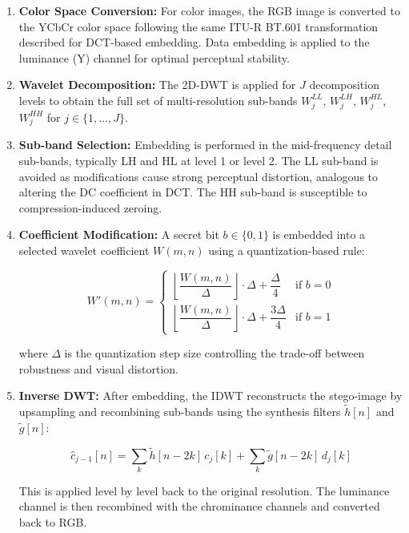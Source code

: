 \documentclass[12pt,a4paper,oneside]{report}
\begin{document}
	\begin{enumerate}
		\item \textbf{Color Space Conversion:}
		For color images, the RGB image is converted to the YCbCr color space following the same ITU-R BT.601 transformation described for DCT-based embedding. Data embedding is applied to the luminance (Y) channel for optimal perceptual stability.
		
		\item \textbf{Wavelet Decomposition:}
		The 2D-DWT is applied for $J$ decomposition levels to obtain the full set of multi-resolution sub-bands $W^{LL}_j$, $W^{LH}_j$, $W^{HL}_j$, $W^{HH}_j$ for $j \in \{1,\dots,J\}$.
		
		\item \textbf{Sub-band Selection:}
		Embedding is performed in the mid-frequency detail sub-bands, typically LH and HL at level 1 or level 2. The LL sub-band is avoided as modifications cause strong perceptual distortion, analogous to altering the DC coefficient in DCT. The HH sub-band is susceptible to compression-induced zeroing.
		
		\item \textbf{Coefficient Modification:}
		A secret bit $b \in \{0, 1\}$ is embedded into a selected wavelet coefficient $W(m,n)$ using a quantization-based rule:
		
		\begin{equation}
			W'(m,n) =
			\begin{cases}
				\left\lfloor \dfrac{W(m,n)}{\Delta} \right\rfloor \cdot \Delta + \dfrac{\Delta}{4} & \text{if } b = 0 \\[10pt]
				\left\lfloor \dfrac{W(m,n)}{\Delta} \right\rfloor \cdot \Delta + \dfrac{3\Delta}{4} & \text{if } b = 1
			\end{cases}
		\end{equation}
		
		where $\Delta$ is the quantization step size controlling the trade-off between robustness and visual distortion.
		
		\item \textbf{Inverse DWT:}
		After embedding, the IDWT reconstructs the stego-image by upsampling and recombining sub-bands using the synthesis filters $\tilde{h}[n]$ and $\tilde{g}[n]$:
		
		\begin{equation}
			\hat{c}_{j-1}[n] = \sum_{k} \tilde{h}[n - 2k]\, c_j[k] + \sum_{k} \tilde{g}[n - 2k]\, d_j[k]
		\end{equation}
		
		This is applied level by level back to the original resolution. The luminance channel is then recombined with the chrominance channels and converted back to RGB.
	\end{enumerate}
	
\end{document}

